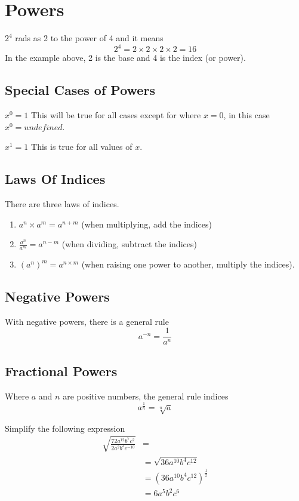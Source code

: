 
\section*{Powers}
$2^4$ rads as 2 to the power of 4 and it means
\[2^4=2\times 2 \times 2\times 2=16\]
In the example above, 2 is the base and 4 is the index (or power).
\subsection*{Special Cases of Powers}
$x^0 = 1$ This will be true for all cases except for where $x=0$, in this case $x^0=undefined$.

$x^1 = 1$ This is true for all values of $x$.

\subsection*{Laws Of Indices}
There are three laws of indices.
\begin{enumerate}
    \item $a^n \times a^m = a^{n+m}$ (when multiplying, add the indices)
    \item $\displaystyle \frac{a^n}{a^m} = a^{n-m}$ (when dividing, subtract the indices)
    \item $\displaystyle (a^n)^m = a^{n\times m}$ (when raising one power to another, multiply the indices).
\end{enumerate}

\subsection*{Negative Powers}
With negative powers, there is a general rule
\[a^{-n} = \frac{1}{a^n}\]

\subsection*{Fractional Powers}
Where $a$ and $n$ are positive numbers, the general rule indices
\[a^{\frac{1}{n}} = \sqrt[n]{a}\]

\begin{example}{Simplify the following expression}
    \begin{align*}
        \sqrt{\frac{72a^{12}b^7c^2}{2a^2b^3c^{-10}}} &=\\
        &= \sqrt{36a^{10}b^4c^{12}}\\
        &= (36a^{10}b^4c^{12})^{\frac{1}{2}}\\
        &= 6a^5b^2c^6
    \end{align*}
\end{example}


